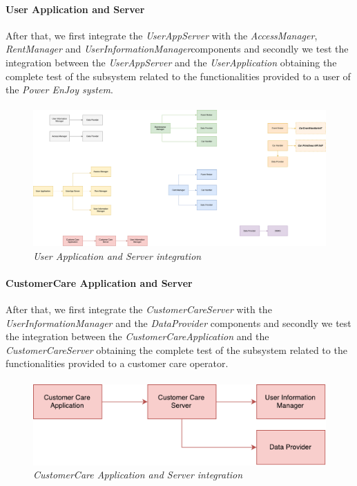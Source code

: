 \paragraph{User Application and Server} 
After that, we first integrate the \emph{UserAppServer} with the \emph{AccessManager}, \emph{RentManager} and \emph{UserInformationManager}components and secondly we test the integration between the \emph{UserAppServer} and the \emph{UserApplication} obtaining the complete test of the subsystem related to the functionalities provided to a user of the \emph{Power EnJoy system}.
\paragraph{}
		
		\begin{figure}[h]
			\centering
			\includegraphics[width=0.7\linewidth]{img/Integration4}
			\caption{
				\label{fig:userAppServer} 
				\emph{User Application and Server integration}
			}
		\end{figure}
		
\paragraph{CustomerCare Application and Server} 
After that, we first integrate the \emph{CustomerCareServer} with the \emph{UserInformationManager} and the \emph{DataProvider} components  and secondly we test the integration between the \emph{CustomerCareApplication} and the \emph{CustomerCareServer} obtaining the complete test of the subsystem related to the functionalities provided to a customer care operator.
\paragraph{}
		
		\begin{figure}[h]
			\centering
			\includegraphics[width=0.8\linewidth]{img/Integration3c}
			\caption{
				\label{fig:ccAppServer} 
				\emph{CustomerCare Application and Server integration}
			}
		\end{figure}

